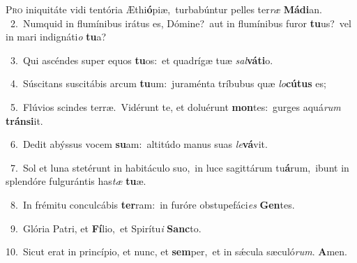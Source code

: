 \lettrine{\initial\textcolor{\initialcolor}{P}}{ro} iniquitáte vidi tentória Æthi\-\textbf{ó}\-piæ,~\star turbabúntur pelles ter\textit{ræ} \textbf{Má}\-\textbf{di}an.\\
{\numbfont\textcolor{\numbcolor}{~2.}}~Numquid in flumínibus irátus es, Dómine?~\dagger aut in flumínibus furor \textbf{tu}\-us?~\star vel in mari indignáti\textit{o} \textbf{tu}\-a?\par
{\numbfont\textcolor{\numbcolor}{~3.}}~Qui ascéndes super equos \textbf{tu}\-os:~\star et quadrígæ tuæ \textit{sal}\-\textbf{vá}\textbf{ti}o.\par
{\numbfont\textcolor{\numbcolor}{~4.}}~Súscitans suscitábis arcum \textbf{tu}\-um:~\star juraménta tríbubus quæ \textit{lo}\-\textbf{cú}\textbf{tus} es;\par
{\numbfont\textcolor{\numbcolor}{~5.}}~Flúvios scindes terræ.~\dagger Vidérunt te, et doluérunt \textbf{mon}\-tes:~\star gurges aquá\textit{rum} \textbf{tráns}\-\textbf{i}it.\par
{\numbfont\textcolor{\numbcolor}{~6.}}~Dedit abýssus vocem \textbf{su}\-am:~\star altitúdo manus suas \textit{le}\-\textbf{vá}vit.\par
{\numbfont\textcolor{\numbcolor}{~7.}}~Sol et luna stetérunt in habitáculo suo,~\dagger in luce sagittárum tu\-\textbf{á}\-rum,~\star ibunt in splendóre fulgurántis has\textit{tæ} \textbf{tu}\-æ.\par
{\numbfont\textcolor{\numbcolor}{~8.}}~In frémitu conculcábis \textbf{ter}\-ram:~\star in furóre obstupefáci\textit{es} \textbf{Gen}\-tes.\par
{\numbfont\textcolor{\numbcolor}{~9.}}~Glória Patri, et \textbf{Fí}\-lio,~\star et Spirítu\textit{i} \textbf{Sanc}\-to.\par
{\numbfont\textcolor{\numbcolor}{10.}}~Sicut erat in princípio, et nunc, et \textbf{sem}\-per,~\star et in sǽcula sæculó\-\textit{rum}\-. \textbf{A}\-men.\par

